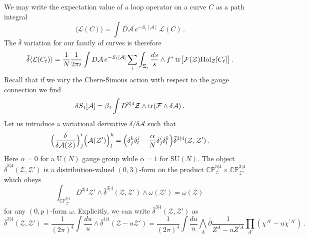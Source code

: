 \documentclass[12pt]{article}
\def \be  {\begin{equation}}
\def \ee  {\end{equation}}
\def \tr {\mathop{\rm tr}\nolimits}
\numberwithin{equation}{section}
\begin{document}
We may write the expectation value of a loop operator on a curve $C$ as a path integral
\be
\langle \mathcal{L}(C)\rangle = \int D \mathcal{A} \,e^{-S_1[\mathcal{A}]}\, \mathcal{L}(C) \,.
\ee
The $\bar{\delta}$ variation for our family of curves is therefore 
\be
\bar{\delta} \langle \mathcal{L}(C_t)\rangle = \frac{1}{N} \frac{1}{2\pi i} \int D \mathcal{A} \,e^{-S_1[\mathcal{A}]} \sum_i \int_{\Sigma_i} \frac{ds}{s} \wedge  f^* \tr \bigl[ \mathcal{F}(\mathcal{Z}) {\rm Hol}_{\mathcal{Z}}[C_t]\bigr] \,.
\label{Finsertion}
\ee
Recall that if we vary the Chern-Simons action with respect to the gauge connection we find
\be
\delta S_1[\mathcal{A}] =  \beta_1 \int D^{3|4}\mathcal{Z} \wedge \tr (\mathcal{F}\wedge \delta \mathcal{A})\,.
\label{CSvariation}
\ee
Let us introduce a variational derivative $\delta/\delta \mathcal{A}$ such that
\be
\Bigl(\frac{\delta}{\delta \mathcal{A}(\mathcal{Z})}\Bigr)^{i}_{j} \Bigl(\mathcal{A} (\mathcal{Z}')\Bigr)^{k}_{l} = \Bigl(\delta_j^k \delta^i_l - \frac{\alpha}{N} \delta^i_j \delta^k_l\Bigr) \bar{\delta}^{3|4}(\mathcal{Z},\mathcal{Z}')\,.
\label{funvarA}
\ee
Here $\alpha = 0$ for a U$(N)$ gauge group while $\alpha=1$ for SU$(N)$. The object $\bar{\delta}^{3|4}(\mathcal{Z},\mathcal{Z}')$ is a distribution-valued $(0,3)$-form on the product $\mathbb{CP}^{3|4}_{\mathcal{Z}} \times \mathbb{CP}^{3|4}_{\mathcal{Z}'}$ which obeys
\be
\int_{\mathbb{CP}^{3|4}_{\mathcal{Z}'}} D^{3|4}\mathcal{Z}' \wedge \bar{\delta}^{3|4}(\mathcal{Z},\mathcal{Z}') \wedge \omega(\mathcal{Z}') = \omega(\mathcal{Z})\,
\ee
for any $(0,p)$-form $\omega$. Explicitly, we can write $\bar{\delta}^{3|4}(\mathcal{Z},\mathcal{Z}')$ as
\be
\bar{\delta}^{3|4}(\mathcal{Z},\mathcal{Z}') = \frac{1}{(2\pi)^4} \int \frac{du}{u} \wedge \bar{\delta}^{4|4}(\mathcal{Z}-u\mathcal{Z}') = \frac{1}{(2\pi)^4} \int \frac{du}{u} \bigwedge_A \bar{\partial}\frac{1}{Z^A-u Z^{\prime A}} \prod_{A'} (\chi^{A'}-u\chi^{\prime A'})\,.
\ee
\end{document}
